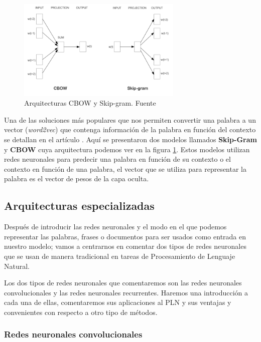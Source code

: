 \begin{figure}[!ht]
	\centering
	\includegraphics[width=0.7\textwidth]{images/arte/word2vec}
	\caption{Arquitecturas CBOW y Skip-gram. Fuente \cite{word2vec}}
	\label{fig:wor2vec}
\end{figure}

Una de las soluciones más populares que nos permiten convertir una palabra a un vector (\textit{word2vec}) que contenga información de la palabra en función del contexto se detallan en el artículo \cite{word2vec} . Aquí se presentaron dos modelos llamados \textbf{Skip-Gram} y \textbf{CBOW} cuya arquitectura podemos ver en la figura \ref{fig:wor2vec}. Estos modelos utilizan redes neuronales para predecir una palabra en función de su contexto o el contexto en función de una palabra, el vector que se utiliza para representar la palabra es el vector de pesos de la capa oculta. 



\subsection{Arquitecturas especializadas}

Después de introducir las redes neuronales y el modo en el que podemos representar las palabras, frases o documentos para ser usados como entrada en nuestro modelo; vamos a centrarnos en comentar dos tipos de redes neuronales que se usan de manera tradicional en tareas de Procesamiento de Lenguaje Natural. 

Los dos tipos de redes neuronales que comentaremos son las redes neuronales convolucionales y las redes neuronales recurrentes. Haremos una introducción a cada una de ellas, comentaremos sus aplicaciones al PLN y sus ventajas y convenientes con respecto a otro tipo de métodos. 


\subsubsection{Redes neuronales convolucionales}

